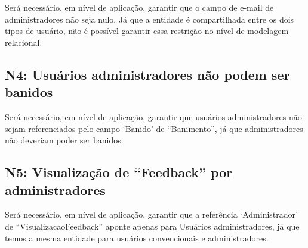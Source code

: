 Será necessário, em nível de aplicação, garantir que o campo de e-mail de
administradores não seja nulo. Já que a entidade é compartilhada entre os dois
tipos de usuário, não é possível garantir essa restrição no nível de modelagem
relacional.

\subsection{\textbf{N4:} Usuários administradores não podem ser banidos}

Será necessário, em nível de aplicação, garantir que usuários administradores
não sejam referenciados pelo campo `Banido' de ``Banimento'', já que
administradores não deveriam poder ser banidos.

\subsection{\textbf{N5:} Visualização de ``Feedback'' por administradores}

Será necessário, em nível de aplicação, garantir que a referência
`Administrador' de ``VisualizacaoFeedback'' aponte apenas para Usuários
administradores, já que temos a mesma entidade para usuários convencionais e
administradores.
